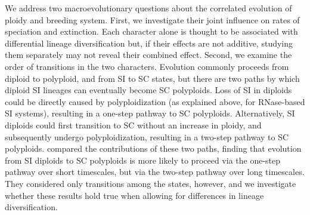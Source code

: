 We address two macroevolutionary questions about the correlated evolution of ploidy and breeding system.
First, we investigate their joint influence on rates of speciation and extinction.
Each character alone is thought to be associated with differential lineage diversification but, if their effects are not additive, studying them separately may not reveal their combined effect.
Second, we examine the order of transitions in the two characters.
Evolution commonly proceeds from diploid to polyploid, and from SI to SC states, but there are two paths by which diploid SI lineages can eventually become SC polyploids.
Loss of SI in diploids could be directly caused by polyploidization (as explained above, for RNase-based SI systems), resulting in a one-step pathway to SC polyploids. 
Alternatively, SI diploids could first transition to SC without an increase in ploidy, and subsequently undergo polyploidization, resulting in a two-step pathway to SC polyploids.
\citet{robertson_2011} compared the contributions of these two paths, finding that evolution from SI diploids to SC polyploids is more likely to proceed via the one-step pathway over short timescales, but via the two-step pathway over long timescales.
They considered only transitions among the states, however, and we investigate whether these results hold true when allowing for differences in lineage diversification.

